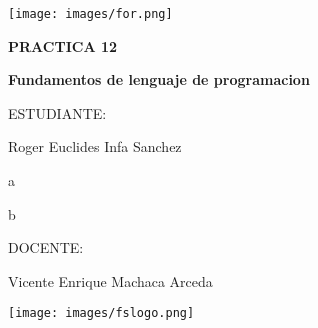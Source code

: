 \pagecolor{white}\afterpage{\nopagecolor}


\texttt{[image: images/for.png]}
\vspace{0.2in}

\begin{singlespace}
\fontsize{60}{65}\selectfont \textcolor{FSBlue}{\textbf{PRACTICA 12}}

\vspace{5mm}
\LARGE\textcolor{FSBlue}{\textbf{Fundamentos de lenguaje de programacion}}

\vspace{0.2in}

\Large\textcolor{FSBlue}{ESTUDIANTE:}

\Large\textcolor{FSBlue}{Roger Euclides Infa Sanchez}

\Large\textcolor{FSBlue}{a}

\Large\textcolor{FSBlue}{b}

\vspace{0.2in}

\Large\textcolor{FSBlue}{DOCENTE:}

\Large\textcolor{FSBlue}{Vicente Enrique Machaca Arceda}

\vspace{0.3in}


\texttt{[image: images/fslogo.png]}
\end{singlespace}

\thispagestyle{empty}
\restoregeometry   
